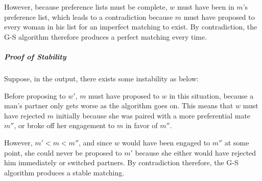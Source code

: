 \documentclass[11pt]{article}
\begin{document}
	However, because preference lists must be complete, $w$ must have been in $m$'s preference list, which leads to a contradiction because $m$ must have proposed to every woman in his list for an imperfect matching to exist. By contradiction, the G-S algorithm therefore produces a perfect matching every time.
	
	\subparagraph{Proof of Stability} Suppose, in the output, there exists some instability as below:
	
	\begin{center}
	\end{center}
	
	Before proposing to $w'$, $m$ must have proposed to $w$ in this situation, because a man's partner only gets worse as the algorithm goes on. This means that $w$ must have rejected $m$ initially because she was paired with a more preferential mate $m''$, or broke off her engagement to $m$ in favor of $m''$.
	
	However, $m' < m < m''$, and since $w$ would have been engaged to $m''$ at some point, she could never be proposed to $m'$ because she either would have rejected him immediately or switched partners. By contradiction therefore, the G-S algorithm produces a stable matching.
\end{document}
